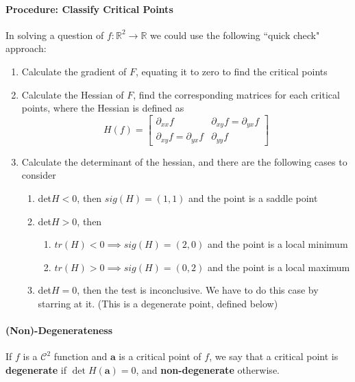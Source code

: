 \documentclass[11pt]{article}
\newcommand{\real}{\mathbb{R}}
\newcommand{\va}{\mathbf{a}}
\begin{document}
\paragraph{Procedure: Classify Critical Points}
In solving a question of $f:\real^2 \rightarrow{} \real$ we could use the following ``quick check" approach:
\begin{enumerate}
    \item Calculate the gradient of $F$, equating it to zero to find the critical points
    \item Calculate the Hessian of $F$, find the corresponding matrices for each critical points, where the Hessian is defined as
    \begin{equation*} H(f) = 
        \begin{bmatrix}
             \partial_{xx}f & \partial_{xy}f = \partial_{yx}f \\
             \partial_{xy}f = \partial_{yx}f & \partial_{yy}f
        \end{bmatrix}
    \end{equation*}
    \item Calculate the determinant of the hessian, and there are the following cases to consider
    \begin{enumerate}
        \item det$H<0$, then $sig(H) = (1,1)$ and the point is a saddle point
        \item det$H>0$, then
            \begin{enumerate}
                \item $tr(H)<0 \implies sig(H) = (2,0)$ and the point is a local minimum
                \item $tr(H)>0 \implies sig(H) = (0,2)$ and the point is a local maximum
            \end{enumerate}
        \item det$H=0$, then the test is inconclusive. We have to do this case by starring at it. (This is a degenerate point, defined below)
    \end{enumerate}
\end{enumerate}

\paragraph{(Non)-Degenerateness} If $f$ is a $\mathcal{C}^2$ function and $\va$ is a critical point of $f$, we say that a critical point is \textbf{degenerate} if $\det H(\va) = 0$, and \textbf{non-degenerate} otherwise.
\end{document}

